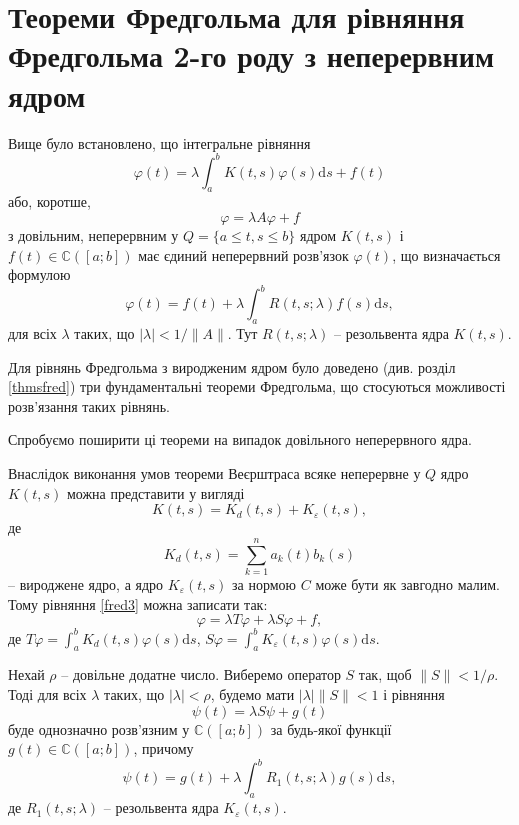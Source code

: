 \documentclass[14pt,twoside]{extreport}
\theoremstyle{mystyle}
\numberwithin{equation}{chapter}
\newcommand{\cab}{\mathbb{C}([a; b])}
\begin{document}
\chapter{Теореми Фредгольма для рівняння Фредгольма 2-го роду з неперервним ядром}\label{fredgeneral}

Вище було встановлено, що інтегральне рівняння
\begin{equation}\label{fred3}
\varphi(t)=\lambda\int_{a}^{b} K(t,s) \varphi(s)\mathrm{d}s + f(t)
\end{equation}
або, коротше,
\[
\varphi = \lambda A \varphi + f
\]
з довільним, неперервним у $Q=\{a \leqslant t, s \leqslant b\}$ ядром $K(t, s)$ і $f(t) \in \cab$ має єдиний неперервний розв'язок $\varphi(t)$, що визначається формулою
\begin{equation}\label{resfr2}
\displaystyle \varphi(t)=f(t)+\lambda\int_{a}^{b}R(t, s;\lambda)f(s)\mathrm{d}s,
\end{equation}
для всіх $\lambda$ таких, що $|\lambda| < 1/ \|A\|$. Тут $R(t, s; \lambda)$ -- резольвента ядра $K(t, s)$.

Для рівнянь Фредгольма з виродженим ядром було доведено (див. розділ \ref{thmsfred}) три фундаментальні теореми Фредгольма, що стосуються можливості розв'язання таких рівнянь.

Спробуємо поширити ці теореми на випадок довільного неперервного ядра.

Внаслідок виконання умов теореми Веєрштраса всяке неперервне у $Q$ ядро $K(t, s)$ можна представити у вигляді
\[
K(t, s) = K_d(t, s) + K_\varepsilon (t, s),
\]
де
\[
K_d(t, s) = \sum_{k=1}^{n} a_k(t) b_k(s)
\]
-- вироджене ядро, а ядро $K_\varepsilon(t, s)$ за нормою $C$ може бути як завгодно малим. Тому рівняння \eqref{fred3} можна записати так:
\begin{equation}\label{opexpfred}
\varphi = \lambda T \varphi + \lambda S\varphi + f,
\end{equation}
де $\displaystyle T\varphi = \int_{a}^{b} K_d(t,s) \varphi(s)\mathrm{d}s$, $\displaystyle S\varphi = \int_{a}^{b} K_\varepsilon (t,s) \varphi(s)\mathrm{d}s$.

Нехай $\rho$ -- довільне додатне число. Виберемо оператор $S$ так, щоб $\|S\|< 1/\rho$. Тоді для всіх $\lambda$ таких, що $|\lambda| < \rho$, будемо мати $|\lambda| \|S\| < 1$ і рівняння
\[
\psi(t) = \lambda S \psi + g(t)
\]
буде однозначно розв'язним у $\cab$ за будь-якої функції $g(t) \in \cab$, причому
\begin{equation}\label{psieq}
\psi(t) = g(t) + \lambda \int_{a}^{b} R_1 (t, s; \lambda) g(s) \mathrm{d}s,
\end{equation}
де $R_1(t, s; \lambda)$ -- резольвента ядра $K_\varepsilon(t, s)$.
\end{document}
